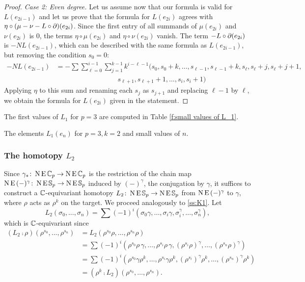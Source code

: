 \begin{proof}
    \medskip\noindent\emph{Case 2: Even degree.}
    Let us assume now that our formula is valid for $L(e_{2i-1})$ and let us prove that the formula for $L(e_{2i})$ agrees with $\eta\circ (\mu - \nu - L\circ \operatorname{\partial})(e_{2i})$. Since the first entry of all summands of $\mu(e_{2i})$ and $\nu(e_{2i})$ is $0$, the terms $\eta\circ \mu(e_{2i})$ and $\eta\circ \nu(e_{2i})$ vanish. The term $-L\circ \operatorname{\partial}(e_{2i})$ is $-N L(e_{2i-1})$, which can be described with the same formula as $L(e_{2i-1})$, but removing the condition $s_0 = 0$:
    \begin{align*}
        -N L(e_{2i-1}) &= -\sum\sum_{\ell = 0}^{i-1}\sum_{j=1}^{k-1} k^{i-\ell-1} (s_0,s_0+k,\ldots,s_{\ell-1},s_{\ell-1}+k,s_{\ell},s_{\ell}+j,s_{\ell}+j+1, \\ & \qquad\qquad\qquad \qquad \quad s_{\ell+1},s_{\ell+1}+1,\ldots,s_i,s_i+1)
    \end{align*}
    Applying $\eta$ to this sum and renaming each $s_j$ as $s_{j+1}$ and replacing $\ell-1$ by $\ell$, we obtain the formula for $L(e_{2i})$ given in the statement.
 \end{proof}

The first values of $L_1$ for $p=3$ are computed in Table \ref{f:small values of L_1}.

\begin{table}
	\centering
	
	\caption{The elements $L_1(e_n)$ for $p=3, k=2$ and small values of $n$.}
	\label{f:small values of L_1}
\end{table}

\subsubsection{The homotopy $L_2$}

Since $\gamma_\ast \colon \operatorname{N}\operatorname{E}\mathbb{C}_p \to \operatorname{N}\operatorname{E}\mathbb{C}_p$ is the restriction of the chain map $\operatorname{N}\operatorname{E}\,(-)^\gamma \colon \operatorname{N}\operatorname{E}\mathbb{S}_p \to \operatorname{N}\operatorname{E}\mathbb{S}_p$ induced by $(-)^\gamma$, the conjugation by $\gamma$, it suffices to construct a $\mathbb{C}$-equivariant homotopy $L_2 \colon \operatorname{N}\operatorname{E}\mathbb{S}_p \to \operatorname{N}\operatorname{E}\mathbb{S}_p$ from $\operatorname{N}\operatorname{E}\,(-)^\gamma$ to $\gamma$, where $\rho$ acts as $\rho^k$ on the target.
We proceed analogously to \cref{ss:K1}.
Let
\[
L_2(\sigma_0,\dots,\sigma_n) = \sum (-1)^i (\sigma_0\gamma,\dots,\sigma_i\gamma,\sigma_i^\gamma,\dots,\sigma_n^\gamma),
\]
which is $\mathbb{C}$-equivariant since
\begin{align*}
	(L_2 \comp \rho)(\rho^{s_0},\dots,\rho^{s_n}) &=
	L_2(\rho^{s_0}\rho, \dots, \rho^{s_n}\rho) \\ &=
	\sum (-1)^i (\rho^{s_0} \rho\,\gamma,\dots,\rho^{s_i} \rho\,\gamma,(\rho^{s_i} \rho)^\gamma,\dots,(\rho^{s_n} \rho)^\gamma) \\ &=
	\sum (-1)^i (\rho^{s_0} \gamma \rho^k,\dots,\rho^{s_i} \gamma \rho^k,(\rho^{s_i})^\gamma \rho^k ,\dots,(\rho^{s_n})^\gamma \rho^k) \\ &=
	(\rho^k \comp L_2)(\rho^{s_0},\dots,\rho^{s_n}).
\end{align*}
